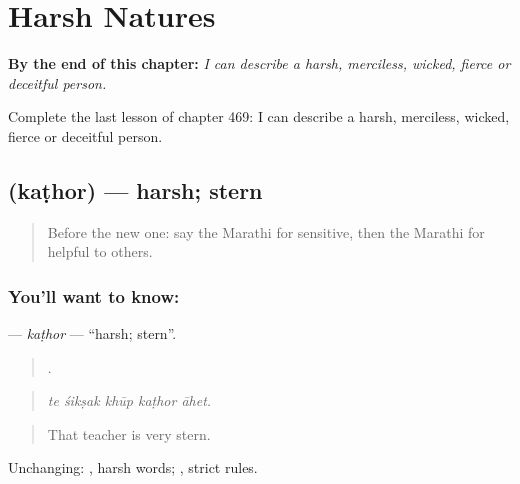 
\chapter{Harsh Natures}
\label{ch:mr-harsh-natures}

\begin{chapteropening}
\textbf{By the end of this chapter:} \emph{I can describe a harsh, merciless, wicked, fierce or deceitful person.}

Complete the last lesson of chapter 469: I can describe a harsh, merciless, wicked, fierce or deceitful person.
\end{chapteropening}

\section[\texorpdfstring{\mr{कठोर} (kaṭhor)}{कठोर (kaṭhor)}]{ (kaṭhor) — harsh; stern}

\label{lesson:MR-C469-kathor}



\begin{quote}
Before the new one: say the Marathi for sensitive, then the Marathi for helpful to others.
\end{quote}

\subsection*{You'll want to know: }
\textbf{} — \emph{kaṭhor} — \textquotedblleft{}harsh; stern\textquotedblright{}.

\begin{quote}
    .
\end{quote}

\begin{quote}
\emph{te śikṣak khūp kaṭhor āhet.}
\end{quote}

\begin{quote}
That teacher is very stern.
\end{quote}

Unchanging:  , harsh words;  , strict rules.

